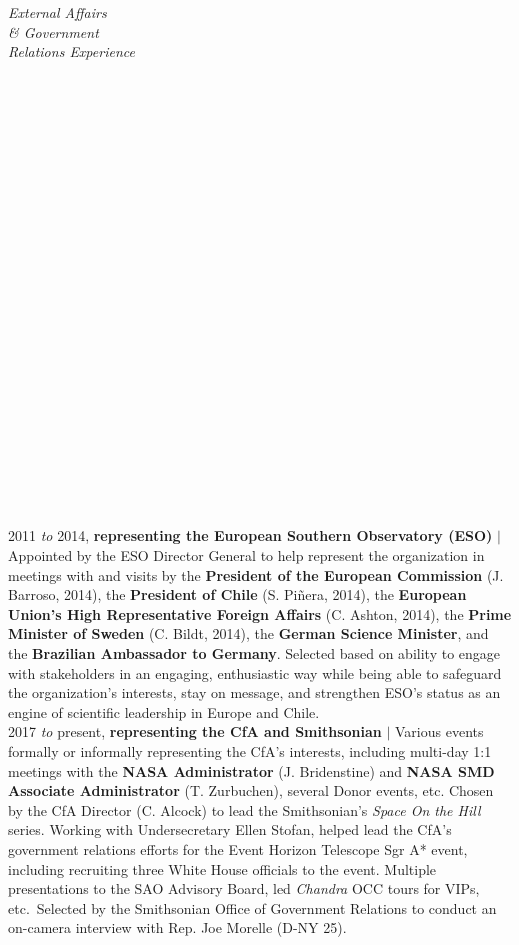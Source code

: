 \documentclass[11pt]{article}
\begin{document}
\hspace{2.5mm} \parbox{1.5in}{\textit{External Affairs \\\& Government \\ Relations Experience \\\\\\\\\\\\\\\\\\\\\\\\\\\\\\\\\\\\\\\\\\\\\\\\}} \parbox{5.15in}{
2011 \textit{to} 2014, \textbf{representing the European Southern Observatory (ESO)} $|$ Appointed by the ESO Director General to help represent the organization in meetings with and visits by the \textbf{President of the European Commission} (J. Barroso, 2014), the \textbf{President of Chile} (S. Piñera, 2014), the \textbf{European Union's High Representative Foreign Affairs} (C. Ashton, 2014), the \textbf{Prime Minister of Sweden} (C. Bildt, 2014), the \textbf{German Science Minister}, and the \textbf{Brazilian Ambassador to Germany}. Selected based on ability to engage with stakeholders in an engaging, enthusiastic way while being able to safeguard the organization's interests, stay on message, and strengthen ESO's status as an engine of scientific leadership in Europe and Chile.\\

2017 \textit{to} present, \textbf{representing the CfA and Smithsonian} $|$ Various events formally or informally representing the CfA's interests, including multi-day 1:1 meetings with the \textbf{NASA Administrator} (J. Bridenstine) and \textbf{NASA SMD Associate Administrator} (T. Zurbuchen), several Donor events, etc. Chosen by the CfA Director (C. Alcock) to lead the Smithsonian's \textit{Space On the Hill} series. Working with Undersecretary Ellen Stofan, helped lead the CfA's government relations efforts for the Event Horizon Telescope Sgr A* event, including recruiting three White House officials to the event. Multiple presentations to the SAO Advisory Board, led \textit{Chandra} OCC tours for VIPs, etc.~Selected by the Smithsonian Office of Government Relations to conduct an on-camera interview with Rep. Joe Morelle (D-NY 25). \\

}
\end{document}
